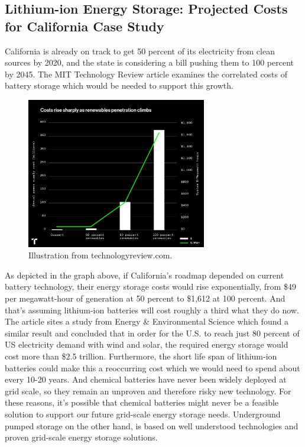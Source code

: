 \documentclass[hidelinks,12pt,a4paper]{article}
\begin{document}
\subsection{Lithium-ion Energy Storage: Projected Costs for California Case Study}

California is already on track to get 50 percent of its electricity from clean sources by 2020, and the state is considering a bill pushing them to 100 percent by 2045. The MIT Technology Review article examines the correlated costs of battery storage which would be needed to support this growth.

\begin{figure}[ht!]
    \centering
    \includegraphics[width=0.7\textwidth]{batterystorage-02_0.png}
    \caption{Illustration from technologyreview.com. \cite{TheTwoPointFiveTrillionReasonWeCantRelyOnBatteries}}
\end{figure}
\FloatBarrier

As depicted in the graph above, if California's roadmap depended on current battery technology, their energy storage costs would rise exponentially, from \$49 per megawatt-hour of generation at 50 percent to \$1,612 at 100 percent. And that's assuming lithium-ion batteries will cost roughly a third what they do now. The article sites a study from Energy \& Environmental Science which found a similar result and concluded that in order for the U.S. to reach just 80 percent of US electricity demand with wind and solar, the required energy storage would cost more than \$2.5 trillion. \cite{TheTwoPointFiveTrillionReasonWeCantRelyOnBatteries} Furthermore, the short life span of lithium-ion batteries could make this a reoccurring cost which we would need to spend about every 10-20 years. And chemical batteries have never been widely deployed at grid scale, so they remain an unproven and therefore risky new technology. For these reasons, it's possible that chemical batteries might never be a feasible solution to support our future grid-scale energy storage needs. Underground pumped storage on the other hand, is based on well understood technologies and proven grid-scale energy storage solutions.
\end{document}
